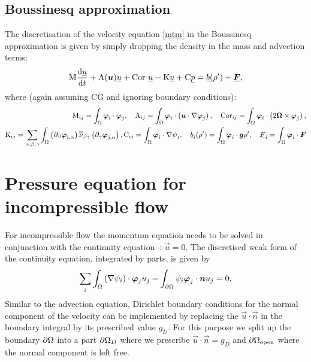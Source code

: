 \subsection{Boussinesq approximation}

The discretisation of the velocity equation \eqref{mtm}
in the Boussinesq approximation is given by simply
dropping the density in the mass and advection terms:
\begin{equation*}
  \mathrm{M} \frac{\mathrm{d}\underline{u}}{\mathrm{d} t}
    +\mathrm{A}({\mbox{\boldmath$u$}})\underline{u}
    +\mathrm{Cor}~\underline{u}
    -\mathrm{K}\underline{u}
    +\mathrm{C} \underline{p}
    =\underline{b}(\rho')+\underline{{\mbox{\boldmath$F$}}},
\end{equation*}
where (again assuming CG and ignoring boundary conditions):
\begin{equation*}
\begin{split}
  \mathrm{M}_{ij}=\int_\Omega {\mbox{\boldmath$\varphi$}}_i\cdot{\mbox{\boldmath$\varphi$}}_j, \quad
  \mathrm{A}_{ij}=\int_\Omega {\mbox{\boldmath$\varphi$}}_i\cdot\left({\mbox{\boldmath$u$}}\cdot\nabla {\mbox{\boldmath$\varphi$}}_j\right), \quad
  \mathrm{Cor}_{ij}=
    \int_\Omega {\mbox{\boldmath$\varphi$}}_i\cdot\left(2{\mbox{\boldmath$\Omega$}}\times{\mbox{\boldmath$\varphi$}}_j\right), \\
  \mathrm{K}_{ij}=\sum_{\alpha,\beta,\gamma} \int_\Omega
    \left(\partial_\beta{\mbox{\boldmath$\varphi$}}_{i,\alpha}\right) \overline{\overline{\nu}}_{\beta\gamma}
      \left(\partial_\gamma {\mbox{\boldmath$\varphi$}}_{j,\alpha}\right),
  \mathrm{C}_{ij}=\int_\Omega {\mbox{\boldmath$\varphi$}}_i\cdot\nabla\psi_j, \quad
    \underline{b}_i(\rho')=\int_\Omega {\mbox{\boldmath$\varphi$}}_i\cdot{\mbox{\boldmath$g$}}\rho',\quad
    \underline{F}_i=\int_\Omega {\mbox{\boldmath$\varphi$}}_i \cdot{\mbox{\boldmath$F$}}
\end{split}
\end{equation*}

\section{Pressure equation for incompressible flow}
\label{Sect:ND_pressure_equation}

For incompressible flow the momentum equation needs to be solved
in conjunction with the continuity equation
$\div\vec u=0$. The discretised weak form of
the continuity equation, integrated by parts, is given by
\begin{equation*}
  \sum_j \int_\Omega \left(\nabla\psi_i\right)\cdot{\mbox{\boldmath$\varphi$}}_j u_j -
    \int_{\partial\Omega} \psi_i{\mbox{\boldmath$\varphi$}}_j\cdot{\mbox{\boldmath$n$}} u_j = 0.
  \label{continuity_byparts}
\end{equation*}
Similar to the advection equation, Dirichlet boundary conditions for the
normal component of the velocity can be implemented by replacing
the $\vec u\cdot\vec n$ in the boundary integral by its prescribed
value $g_D$. For this purpose we split up the
boundary ${\partial\Omega}$ into a part
${\partial\Omega}_D$ where we prescribe $\vec u\cdot\vec n=g_D$ and
${\partial\Omega}_{\mathrm{open}}$ where the normal component is left free.

